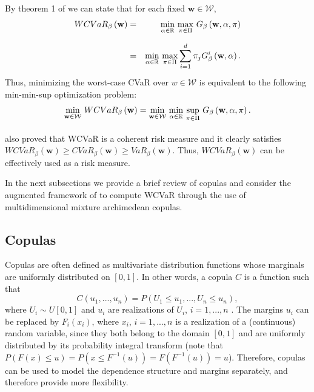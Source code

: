 \documentclass[a4paper,10pt]{article}
\begin{document}
\vspace{0.3cm}
By theorem 1 of \citet*{zhu2009worst} we can state that for each fixed $%
\mathbf{w}\in \mathcal{W}$,
\begin{eqnarray}
WCVaR_{\beta }\left( \mathbf{w}\right) &=&\underset{}{\underset{\alpha \in
		\mathbb{R}
	}{\min }~\underset{\pi \in \Pi }{\max }}~G_{\beta }\left( \mathbf{w},\alpha
,\pi \right)  \notag \\
&=&\underset{}{\underset{\alpha \in
		\mathbb{R}
	}{\min }~\underset{\pi \in \Pi }{\max }}\sum_{i=1}^{d}\pi _{j}G_{\beta
}^{i}\left( \mathbf{w},\alpha \right) .  \label{18}
\end{eqnarray}%
Thus, minimizing the worst-case CVaR over $w\in \mathcal{W}$ is equivalent
to the following min-min-sup optimization problem:
\begin{equation}
\underset{}{\underset{\mathbf{w}\in \mathcal{W}}{\min }}~WCVaR_{\beta
}\left( \mathbf{w}\right) =\underset{}{\underset{\mathbf{w}\in \mathcal{W}}{%
		\min }~\underset{\alpha \in
		\mathbb{R}
	}{\min }~\underset{\pi \in \Pi }{\sup }}~G_{\beta }\left( \mathbf{w},\alpha
,\pi \right) .  \label{19}
\end{equation}%
\citet*{zhu2009worst} also proved that WCVaR is a coherent risk measure and
it clearly satisfies $WCVaR_{\beta }\left( \mathbf{w}\right) \geq
CVaR_{\beta }\left( \mathbf{w}\right) \geq VaR_{\beta }\left( \mathbf{w}%
\right) $. Thus, $WCVaR_{\beta }\left( \mathbf{w}\right) $ can be
effectively used as a risk measure.

\bigskip

In the next subsections we provide a brief review of copulas and consider
the augmented framework of \citet*{kakouris14} to compute WCVaR through the
use of multidimensional mixture archimedean copulas.

\subsection{Copulas}

Copulas are often defined as multivariate distribution functions whose
marginals are uniformly distributed on $[0,1]$. In other words, a copula $C$
is a function such that
\begin{equation}
C\left( u_{1},...,u_{n}\right) =P\left( U_{1}\leq u_{1},...,U_{n}\leq
u_{n}\right) ,  \label{20}
\end{equation}%
where $U_{i}\sim U[0,1]$ and $u_{i}$ are realizations of $U_{i}$, $i=1,...,n$%
. The margins $u_{i}$ can be replaced by $F_{i}\left( x_{i}\right) $, where $%
x_{i}$, $i=1,...,n$ is a realization of a (continuous) random variable,
since they both belong to the domain $[0,1]$ and are uniformly distributed
by its probability integral transform (note that $P\left( F\left( x\right)
\leq u\right) =P\left( x\leq F^{-1}\left( u\right) \right) =F\left(
F^{-1}\left( u\right) \right) =u$). Therefore, copulas can be used to model
the dependence structure and margins separately, and therefore provide more
flexibility.
\end{document}
